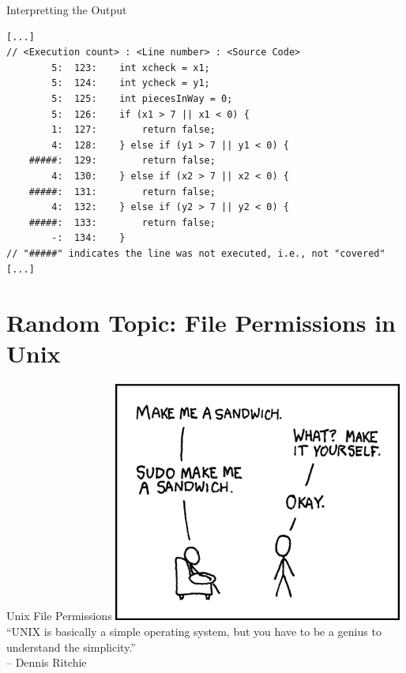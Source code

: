 \documentclass[11pt]{beamer}
\begin{document}
\begin{frame}[fragile=singleslide]{Interpretting the Output}
\footnotesize
\begin{lstlisting}[style=C]
[...]
// <Execution count> : <Line number> : <Source Code>
        5:  123:	int xcheck = x1;
        5:  124:	int ycheck = y1;
        5:  125:	int piecesInWay = 0;
        5:  126:	if (x1 > 7 || x1 < 0) {
        1:  127:		return false;
        4:  128:	} else if (y1 > 7 || y1 < 0) {
    #####:  129:		return false;
        4:  130:	} else if (x2 > 7 || x2 < 0) {
    #####:  131:		return false;
        4:  132:	} else if (y2 > 7 || y2 < 0) {
    #####:  133:		return false;
        -:  134:	}
// "#####" indicates the line was not executed, i.e., not "covered"
[...]
\end{lstlisting}

\end{frame}

\section[Permissions]{Random Topic: File Permissions in Unix}
\begin{frame}{Unix File Permissions}
\center
\includegraphics[scale=0.4]{sandwich.png} \\
``UNIX is basically a simple operating system, but you have to be a genius to understand the simplicity.''  \\ -- Dennis Ritchie
\end{frame}
\end{document}
